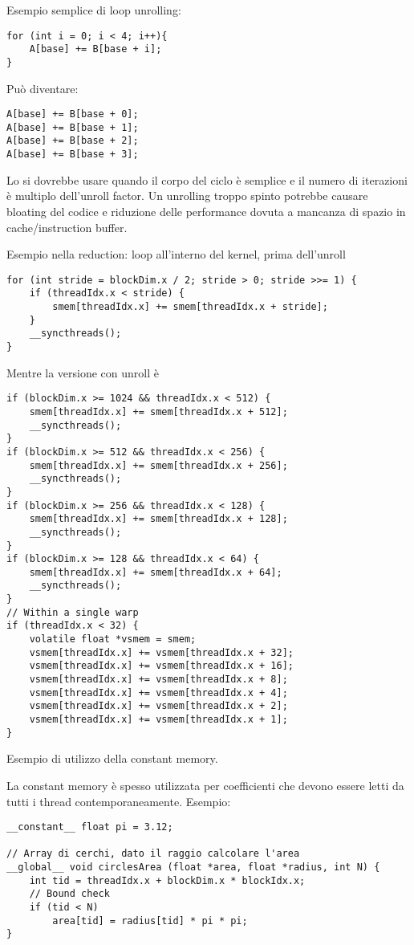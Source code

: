 \begin{questions}
\begin{solution}
        Esempio semplice di loop unrolling: 
        \begin{verbatim}
for (int i = 0; i < 4; i++){
    A[base] += B[base + i];
}
        \end{verbatim}
        Può diventare:
        \begin{verbatim}
A[base] += B[base + 0];
A[base] += B[base + 1];
A[base] += B[base + 2];
A[base] += B[base + 3];
        \end{verbatim}
        
        Lo si dovrebbe usare quando il corpo del ciclo è semplice e il numero di iterazioni è multiplo dell'unroll factor. Un unrolling troppo spinto potrebbe causare bloating del codice e riduzione delle performance dovuta a mancanza di spazio in cache/instruction buffer.
        
        Esempio nella reduction: loop all'interno del kernel, prima dell'unroll
        \begin{verbatim}
for (int stride = blockDim.x / 2; stride > 0; stride >>= 1) {
    if (threadIdx.x < stride) {
        smem[threadIdx.x] += smem[threadIdx.x + stride];
    }
    __syncthreads();
}
        \end{verbatim}
        
        Mentre la versione con unroll è
        \begin{verbatim}
if (blockDim.x >= 1024 && threadIdx.x < 512) {
    smem[threadIdx.x] += smem[threadIdx.x + 512];
    __syncthreads();
}
if (blockDim.x >= 512 && threadIdx.x < 256) {
    smem[threadIdx.x] += smem[threadIdx.x + 256];
    __syncthreads();
}
if (blockDim.x >= 256 && threadIdx.x < 128) {
    smem[threadIdx.x] += smem[threadIdx.x + 128];
    __syncthreads();
}
if (blockDim.x >= 128 && threadIdx.x < 64) {
    smem[threadIdx.x] += smem[threadIdx.x + 64];
    __syncthreads();
}
// Within a single warp
if (threadIdx.x < 32) {
    volatile float *vsmem = smem;
    vsmem[threadIdx.x] += vsmem[threadIdx.x + 32];
    vsmem[threadIdx.x] += vsmem[threadIdx.x + 16];
    vsmem[threadIdx.x] += vsmem[threadIdx.x + 8];
    vsmem[threadIdx.x] += vsmem[threadIdx.x + 4];
    vsmem[threadIdx.x] += vsmem[threadIdx.x + 2];
    vsmem[threadIdx.x] += vsmem[threadIdx.x + 1];
}
        \end{verbatim}
    \end{solution}
    
    \question Esempio di utilizzo della constant memory.
    
    \begin{solution}
        La constant memory è spesso utilizzata per coefficienti che devono essere letti da tutti i thread contemporaneamente. Esempio:
        \begin{verbatim}
__constant__ float pi = 3.12;

// Array di cerchi, dato il raggio calcolare l'area
__global__ void circlesArea (float *area, float *radius, int N) {
    int tid = threadIdx.x + blockDim.x * blockIdx.x;
    // Bound check
    if (tid < N)
        area[tid] = radius[tid] * pi * pi;
}
        \end{verbatim}
    \end{solution}
\end{questions}